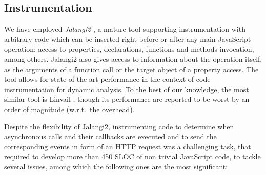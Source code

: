 \subsection*{Instrumentation}
We have employed \emph{Jalangi2} \cite{jalangi}, a mature tool supporting instrumentation with 
arbitrary code which can be inserted right before or after any main JavaScript operation: access to properties, declarations, functions and methods invocation, among others. Jalangi2 also gives access to information about the operation itself, as the arguments of a function call or the target object of a property access.
The tool allows for state-of-the-art performance in the context of code instrumentation for dynamic analysis.
To the best of our knowledge, the most similar tool is Linvail \cite{linvail}, though its performance are reported to be worst by an order of magnitude (w.r.t.\ the overhead).

Despite the flexibility of Jalangi2, instrumenting code to determine when asynchronous calls and their callbacks are executed and to send the corresponding events in form of an HTTP request was a challenging task, that required to develop more than 450 SLOC of non trivial JavaScript code, to tackle
several issues, among which the following ones are the most significant:

